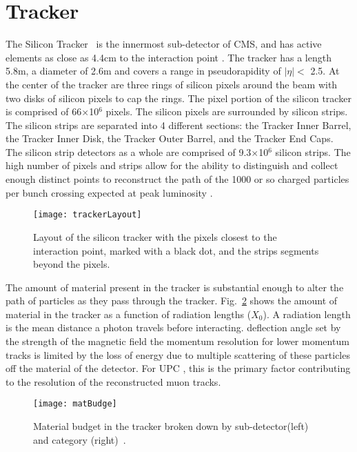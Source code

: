   \section{Tracker}
    The Silicon Tracker~\cite{CMS:2000aa} is the innermost sub-detector of CMS, and has active
    	elements as close as 4.4cm to the interaction point \cite{tCmsE}. 
    The tracker has a length 5.8m, a diameter of 2.6m and
    	covers a range in pseudorapidity of $|\eta| <$ 2.5.
    At the center of the tracker are three rings of silicon pixels around the beam 
    	with two disks of silicon pixels to cap the rings.
    The pixel portion of the silicon tracker is comprised of 66$\times$10$^{6}$
    	pixels.
    The silicon pixels are surrounded by silicon strips.
    The silicon strips are separated into 4 different sections: 
    	the Tracker Inner Barrel, the Tracker Inner Disk, the Tracker Outer 
    	Barrel, and the Tracker End Caps.
    The silicon strip detectors as a whole are comprised of 9.3$\times$10$^{6}$ silicon 
    	strips.
    The high number of pixels and strips allow for the ability to distinguish
    	and collect enough distinct points to reconstruct the path of the 1000
    	or so charged particles per bunch crossing expected at peak luminosity
    	\cite{tCmsE}.
    \begin{figure}[!Hhbt]
      \centering
      \texttt{[image: trackerLayout]}
      \caption{Layout of the silicon tracker with the pixels closest to the 
        interaction point, marked with a black dot, and the strips segments 
        beyond the pixels.}
      \label{fig:fig:trackerLayout}
    \end{figure}

    The amount of material present in the tracker is substantial enough to
      alter the path of particles as they pass through the tracker. 
    Fig.~\ref{fig:matBudge} shows the amount of material in the tracker 
      as a function of radiation lengths ($X_{0}$).
    A radiation length is the mean distance a photon travels before 
      interacting. 
    \DIFdelbegin {}\DIFdelend \DIFaddbegin {}\DIFaddend deflection angle set by the strength of the magnetic 
      field \DIFdelbegin \DIFdel{, }\DIFdelend \DIFaddbegin {}\DIFaddend the momentum resolution for \DIFaddbegin {}\DIFaddend lower momentum tracks is limited by 
      the loss of energy due to multiple scattering of these particles off the 
      material of the detector.
    For UPC \JPsi{}, this is the primary factor contributing to the resolution 
      of the reconstructed muon tracks. 
    \begin{figure}[!Hhbt]
      \centering
      \texttt{[image: matBudge]}
      \caption{Material budget in the tracker broken down by sub-detector(left) and
        category (right)~\cite{tCmsE}.}
      \label{fig:matBudge}
    \end{figure}

